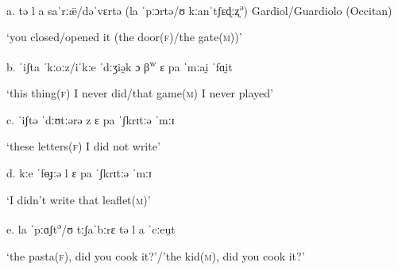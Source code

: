 \documentclass[output=paper]{langscibook}
\begin{document}
\begin{styleTabellaLUNGA}
\ea%
    \label{ex:key:16}
    \gll \\
         \\
    \glt
    \z %

          a.  tə l a saˈrː\"{æ}/dəˈvɛrtə (la ˈpːɔrtə/ʊ kːanˈtʃɛɖːʐ\textsuperscript{ə})\textsuperscript{} Gardiol/Guardiolo (Occitan)
\end{styleTabellaLUNGA}

\begin{styleTabellaLUNGA}
      ‘you closed/opened it (the door(\textsc{f})/the gate(\textsc{m}))’
\end{styleTabellaLUNGA}

\begin{styleTabellaLUNGA}
  b.  ˈiʃta ˈkːoːz/iˈkːe ˈdːʒiə̯k ɔ β\textsuperscript{w} ɛ pa ˈmːai̯ ˈfɑi̯t
\end{styleTabellaLUNGA}

\begin{styleTabellaLUNGA}
      ‘this thing(\textsc{f}) I never did/that game(\textsc{m}) I never played’
\end{styleTabellaLUNGA}

\begin{styleTabellaLUNGA}
  c.  ˈiʃtə ˈdːʊtːərə z ɛ pa ˈʃkrɪtːə ˈmːɪ
\end{styleTabellaLUNGA}

\begin{styleTabellaLUNGA}
      ‘these letters(\textsc{f}) I did not write’
\end{styleTabellaLUNGA}

\begin{styleTabellaLUNGA}
  d.  kːe ˈfɵɟːə l ɛ pa ˈʃkrɪtːə ˈmːɪ
\end{styleTabellaLUNGA}

\begin{styleTabellaLUNGA}
      ‘I didn’t write that leaflet(\textsc{m})’
\end{styleTabellaLUNGA}

\begin{styleTabellaLUNGA}
  e.  la ˈpːɑʃt\textsuperscript{ə}/ʊ tːʃaˈbːrɛ tə l a ˈcːeu̯t
\end{styleTabellaLUNGA}

\begin{styleTabellaLUNGA}
      ‘the pasta(\textsc{f}), did you cook it?’/’the kid(\textsc{m}), did you cook it?’
\end{styleTabellaLUNGA}
\end{document}
